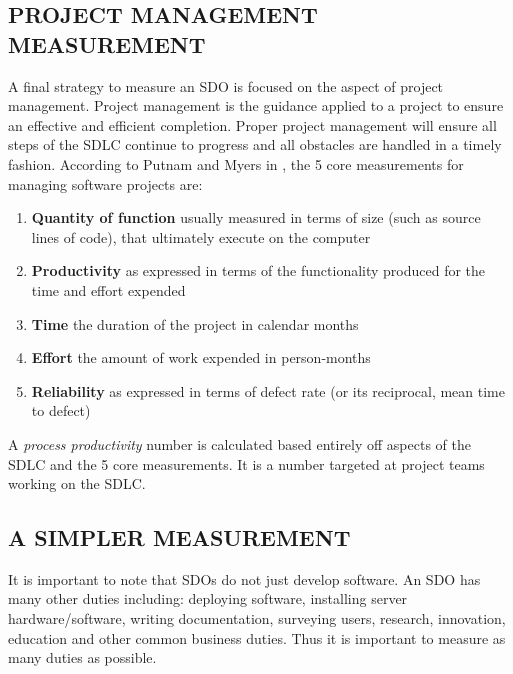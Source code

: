 \documentclass[SDSUThesis.tex]{subfiles}
\begin{document}
    \subsection{PROJECT MANAGEMENT MEASUREMENT}
    \label{sec:pm}
        A final strategy to measure an SDO is focused on the aspect of
        project management. Project management is the guidance
        applied to a project to ensure an effective and efficient
        completion.  Proper project management will ensure all steps
        of the SDLC
        continue to progress and all obstacles are handled
        in a timely fashion.  
        According to Putnam and Myers in \cite{Putnam2013}, 
        the 5 core measurements for managing software
        projects are:
        
        \begin{enumerate}
            \item \textbf{Quantity of function} usually measured in terms of size (such as source lines of code), that ultimately execute on the computer
            \item \textbf{Productivity} as expressed in terms of the functionality produced for the time and effort expended
            \item \textbf{Time} the duration of the project in calendar months
            \item \textbf{Effort} the amount of work expended in person-months
            \item \textbf{Reliability} as expressed in terms of defect rate (or its reciprocal, mean time to defect)
        \end{enumerate}
        
        A \textit{process productivity} number is calculated based entirely
        off aspects of the SDLC and the 5 core measurements.  It is a number
        targeted at project teams working on the SDLC.  
       
        

    \subsection{A SIMPLER MEASUREMENT}
    
        It is important to note that SDOs do not just
        develop software.  An SDO has many other duties
        including: deploying software, installing server hardware/software,
        writing documentation, surveying users, research, innovation,
        education and other common business duties.  Thus it is
        important to measure as many duties as possible.  
    
\end{document}
